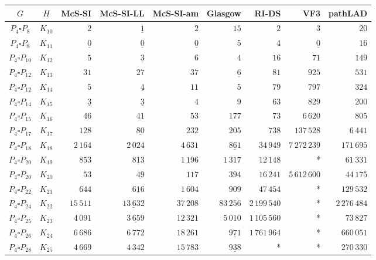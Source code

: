
\begin{tabular}{ccrrrrrrr}
    \toprule
    {$G$} & {$H$} & {McS-SI} & {McS-SI-LL} & {McS-SI-am} & Glasgow & RI-DS & VF3 & pathLAD \\ 
    \midrule

$P_4\square P_{8}$ & $K_{10}$ & $2$ & $\underline{1}$ & $2$ & $15$ & $2$ & $3$ & $20$\\
$P_4\square P_{8}$ & $K_{11}$ & $\underline{0}$ & $\underline{0}$ & $\underline{0}$ & $5$ & $4$ & $\underline{0}$ & $16$\\
$P_4\square P_{10}$ & $K_{12}$ & $5$ & $\underline{3}$ & $6$ & $4$ & $16$ & $71$ & $149$\\
$P_4\square P_{12}$ & $K_{13}$ & $31$ & $27$ & $37$ & $\underline{6}$ & $81$ & $925$ & $531$\\
$P_4\square P_{12}$ & $K_{14}$ & $5$ & $\underline{4}$ & $11$ & $5$ & $79$ & $797$ & $324$\\
$P_4\square P_{14}$ & $K_{15}$ & $\underline{3}$ & $\underline{3}$ & $4$ & $9$ & $63$ & $829$ & $200$\\
$P_4\square P_{15}$ & $K_{16}$ & $46$ & $\underline{41}$ & $53$ & $177$ & $73$ & $6\,620$ & $805$\\
$P_4\square P_{17}$ & $K_{17}$ & $128$ & $\underline{80}$ & $232$ & $205$ & $738$ & $137\,528$ & $6\,441$\\
$P_4\square P_{18}$ & $K_{18}$ & $2\,164$ & $2\,024$ & $4\,631$ & $\underline{861}$ & $34\,949$ & $7\,272\,239$ & $171\,695$\\
$P_4\square P_{20}$ & $K_{19}$ & $853$ & $\underline{813}$ & $1\,196$ & $1\,317$ & $12\,148$ & * & $61\,331$\\
$P_4\square P_{20}$ & $K_{20}$ & $53$ & $\underline{49}$ & $117$ & $394$ & $16\,241$ & $5\,612\,600$ & $44\,175$\\
$P_4\square P_{22}$ & $K_{21}$ & $644$ & $\underline{616}$ & $1\,604$ & $909$ & $47\,454$ & * & $129\,532$\\
$P_4\square P_{24}$ & $K_{22}$ & $15\,511$ & $\underline{13\,632}$ & $37\,208$ & $83\,256$ & $2\,199\,540$ & * & $2\,276\,484$\\
$P_4\square P_{25}$ & $K_{23}$ & $4\,091$ & $\underline{3\,659}$ & $12\,321$ & $5\,010$ & $1\,105\,560$ & * & $73\,827$\\
$P_4\square P_{26}$ & $K_{24}$ & $6\,686$ & $6\,772$ & $18\,261$ & $\underline{971}$ & $1\,761\,964$ & * & $660\,051$\\
$P_4\square P_{28}$ & $K_{25}$ & $4\,669$ & $4\,342$ & $15\,783$ & $\underline{938}$ & * & * & $270\,330$\\

\end{tabular}
